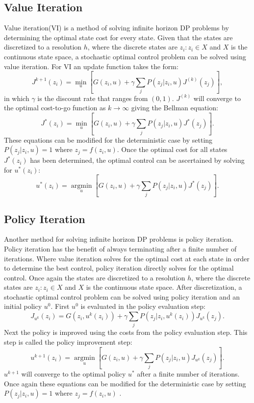 \subsection{Value Iteration}
Value iteration(VI) is a method of solving infinite horizon DP problems by determining the optimal state cost for every state. Given that the states are discretized to a resolution $h$, where the discrete states are ${z_i:z_i \in X}$ and $X$ is the continuous state space, a stochastic optimal control problem can be solved using value iteration. For VI an update function takes the form:
\begin{equation}\label{dpvi}
J^{k+1}(z_i)= \underset{u }{\operatorname{min }}[G(z_i,u) + \gamma \sum_{j}P(z_j|z_i, u)J^{(k)}(z_j)],
\end{equation}
in which $\gamma$ is the discount rate that ranges from $(0,1)$. $J^{(k)}$ will converge to the optimal cost-to-go function as $k \rightarrow \infty$ giving the Bellman equation:
\begin{equation*}
J^*(z_i) = \underset{u }{\operatorname{min }}[G(z_i,u) + \gamma \sum_{j}P(z_j|z_i,u)J^*(z_j)].
\end{equation*}
These equations can be modified for the deterministic case by setting $P(z_j|z_i, u)=1$ where $z_j = f(z_i,u)$. Once the optimal cost for all states $J^*(z_i)$ has been determined, the optimal control can be ascertained by solving for $u^*(z_i)$:
\begin{equation}\label{udpvi}
u^*(z_i) = \underset{u }{\operatorname{arg min }}[G(z_i,u) + \gamma \sum_{j}P(z_j|z_i,u)J^*(z_j)].
\end{equation}      

\subsection{Policy Iteration}
Another method for solving infinite horizon DP problems is policy iteration. Policy iteration has the benefit of always terminating after a finite number of iterations. Where value iteration solves for the optimal cost at each state in order to determine the best control, policy iteration directly solves for the optimal control. Once again the states are discretized to a resolution $h$, where the discrete states are ${z_i:z_i \in X}$ and $X$ is the continuous state space. After discretization, a stochastic optimal control problem can be solved using policy iteration and an initial policy $u^0$. First $u^0$ is evaluated in the policy evaluation step:
\begin{equation}\label{dppi}
J_{u^k}(z_i)= G(z_i,u^k(z_i)) + \gamma \sum_{j}P(z_j|z_i, u^k(z_i))J_{u^k}(z_j).
\end{equation}
Next the policy is improved using the costs from the policy evaluation step. This step is called the policy improvement step:
\begin{equation}\label{udppi}
u^{k+1}(z_i) = \underset{u }{\operatorname{arg min }}[G(z_i,u) + \gamma \sum_{j}P(z_j|z_i,u)J_{u^k}(z_j)].
\end{equation} 
$u^{k+1}$ will converge to the optimal policy $u^*$ after a finite number of iterations. Once again these equations can be modified for the deterministic case by setting $P(z_j|z_i, u)=1$ where $z_j = f(z_i,u)$ \cite{bert}. 